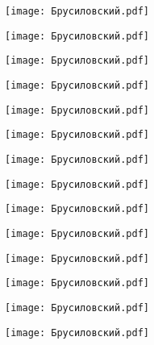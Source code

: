 \documentclass[main.tex]{subfiles}
\begin{document}
\begin{center}
\texttt{[image: Брусиловский.pdf]}
\end{center}

\begin{center}
\texttt{[image: Брусиловский.pdf]}
\end{center}

\begin{center}
\texttt{[image: Брусиловский.pdf]}
\end{center}

\begin{center}
\texttt{[image: Брусиловский.pdf]}
\end{center}

\begin{center}
\texttt{[image: Брусиловский.pdf]}
\end{center}

\begin{center}
\texttt{[image: Брусиловский.pdf]}
\end{center}

\begin{center}
\texttt{[image: Брусиловский.pdf]}
\end{center}

\begin{center}
\texttt{[image: Брусиловский.pdf]}
\end{center}

\begin{center}
\texttt{[image: Брусиловский.pdf]}
\end{center}

\begin{center}
\texttt{[image: Брусиловский.pdf]}
\end{center}

\begin{center}
\texttt{[image: Брусиловский.pdf]}
\end{center}

\begin{center}
\texttt{[image: Брусиловский.pdf]}
\end{center}

\begin{center}
\texttt{[image: Брусиловский.pdf]}
\end{center}

\begin{center}
\texttt{[image: Брусиловский.pdf]}
\end{center}
\end{document}
